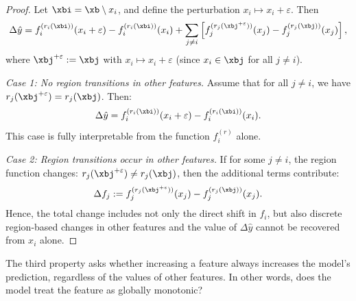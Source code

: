\begin{proof}
Let \( \xbi = \xb \setminus x_i \), and define the perturbation \( x_i \mapsto x_i + \varepsilon \). Then
\[
\Delta \hat{y} = f_i^{(r_i(\xbi))}(x_i + \varepsilon) - f_i^{(r_i(\xbi))}(x_i)
+ \sum_{j \ne i} \left[ f_j^{(r_j(\xbj^{+\varepsilon}))}(x_j) - f_j^{(r_j(\xbj))}(x_j) \right],
\]
where \( \xbj^{+\varepsilon} := \xbj \) with \( x_i \mapsto x_i + \varepsilon \) (since \( x_i \in \xbj \) for all \( j \ne i \)).

\textit{Case 1: No region transitions in other features.}
Assume that for all \( j \ne i \), we have \( r_j(\xbj^{+\varepsilon}) = r_j(\xbj) \). Then:
\[
\Delta \hat{y} = f_i^{(r_i(\xbi))}(x_i + \varepsilon) - f_i^{(r_i(\xbi))}(x_i).
\]
This case is fully interpretable from the function \( f_i^{(r)} \) alone.

\textit{Case 2: Region transitions occur in other features.}
If for some \( j \ne i \), the region function changes: \( r_j(\xbj^{+\varepsilon}) \ne r_j(\xbj) \), then the additional terms contribute:
\[
\Delta f_j := f_j^{(r_j(\xbj^{+\varepsilon}))}(x_j) - f_j^{(r_j(\xbj))}(x_j).
\]
Hence, the total change includes not only the direct shift in \( f_i \), but also discrete region-based changes in other features and the value of \( \Delta \hat{y} \) cannot be recovered from \( x_i \) alone. 
\end{proof}

The third property asks whether increasing a feature always increases the model's prediction, regardless of the values of other features. In other words, does the model treat the feature as globally monotonic?


